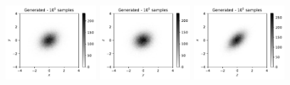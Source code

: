 \documentclass[twocolumn,preprintnumbers,superscriptaddress]{revtex4-2}
\newcommand{\commentAF}[1]{{\color{cyan} {[A: #1]}}}
\begin{document}




\begin{figure}
  \includegraphics[width=0.3\textwidth]{plots/3Dgaussian_posdef/1-2_FAKE_100k.pdf}%
  \includegraphics[width=0.3\textwidth]{plots/3Dgaussian_posdef/2-3_FAKE_100k.pdf}%
  \includegraphics[width=0.3\textwidth]{plots/3Dgaussian_posdef/3-1_FAKE_100k.pdf}


\end{figure}
\end{document}
